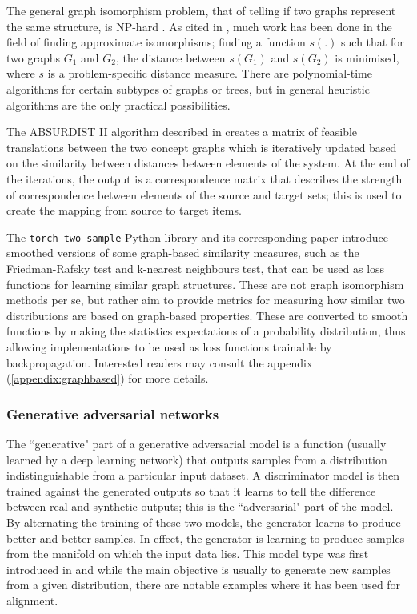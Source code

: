 The general graph isomorphism problem, that of telling if two graphs represent the same structure, is NP-hard \cite{GraphIsomorphismNPHard}. As cited in \cite{Absurdist2}, much work has been done in the field of finding approximate isomorphisms; finding a function $s(.)$ such that for two graphs $G_1$ and $G_2$, the distance between $s(G_1)$ and $s(G_2)$ is minimised, where $s$ is a problem-specific distance measure. There are polynomial-time algorithms for certain subtypes of graphs or trees, but in general heuristic algorithms are the only practical possibilities. 

The ABSURDIST II algorithm described in \cite{Absurdist2} creates a matrix of feasible translations between the two concept graphs which is iteratively updated based on the similarity between distances between elements of the system. At the end of the iterations, the output is a correspondence matrix that describes the strength of correspondence between elements of the source and target sets; this is used to create the mapping from source to target items. 

The \texttt{torch-two-sample} Python library and its corresponding paper \cite{torchtwosample} introduce smoothed versions of some graph-based similarity measures, such as the Friedman-Rafsky test and k-nearest neighbours test, that can be used as loss functions for learning similar graph structures. These are not graph isomorphism methods per se, but rather aim to provide metrics for measuring how similar two distributions are based on graph-based properties. These are converted to smooth functions by making the statistics expectations of a probability distribution, thus allowing implementations to be used as loss functions trainable by backpropagation. Interested readers may consult the appendix (\ref{appendix:graphbased}) for more details. 

\newpage
\subsubsection{Generative adversarial networks}

The ``generative" part of a generative adversarial model is a function (usually learned by a deep learning network) that outputs samples from a distribution indistinguishable from a particular input dataset. A discriminator model is then trained against the generated outputs so that it learns to tell the difference between real and synthetic outputs; this is the ``adversarial" part of the model. By alternating the training of these two models, the generator learns to produce better and better samples. In effect, the generator is learning to produce samples from the manifold on which the input data lies. This model type was first introduced in \cite{GAN} and while the main objective is usually to generate new samples from a given distribution, there are notable examples where it has been used for alignment.


